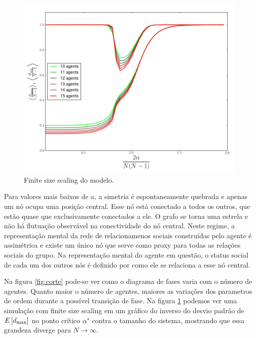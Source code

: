 \begin{figure}
  \includegraphics[width = \textwidth]{./figuras/manysizes.png}
  \caption{Finite size scaling do modelo.}
  \label{fig:finitess}
\end{figure}

Para valores mais baixos de $a$, a simetria é espontaneamente quebrada e apenas um nó ocupa uma posição central. Esse nó está conectado a todos os outros, que estão quase que exclusivamente conectados a ele. O grafo se torna uma estrela e não há flutuação observável na conectividade do nó central. Neste regime, a representação mental da rede de relacionamenos sociais construídas pelo agente é assimétrica e existe um único nó que serve como proxy para todas as relações sociais do grupo. Na representação mental do agente em questão, o status social de cada um dos outros nós é definido por como ele se relaciona a esse nó central.

Na figura \ref{fig:corte} pode-se ver como o diagrama de fases varia com o número de agentes. Quanto maior o número de agentes, maiores as variações dos parametros de ordem durante a possível transição de fase. Na figura \ref{fig:finitess} podemos ver uma simulação com finite size scaling em um gráfico do inverso do desvio padrão de $E\left[d_{\text{max}}\right]$ no ponto crítico $\alpha^{\star}$ contra o tamanho do sistema, mostrando que essa grandeza diverge para $N\to \infty$.

